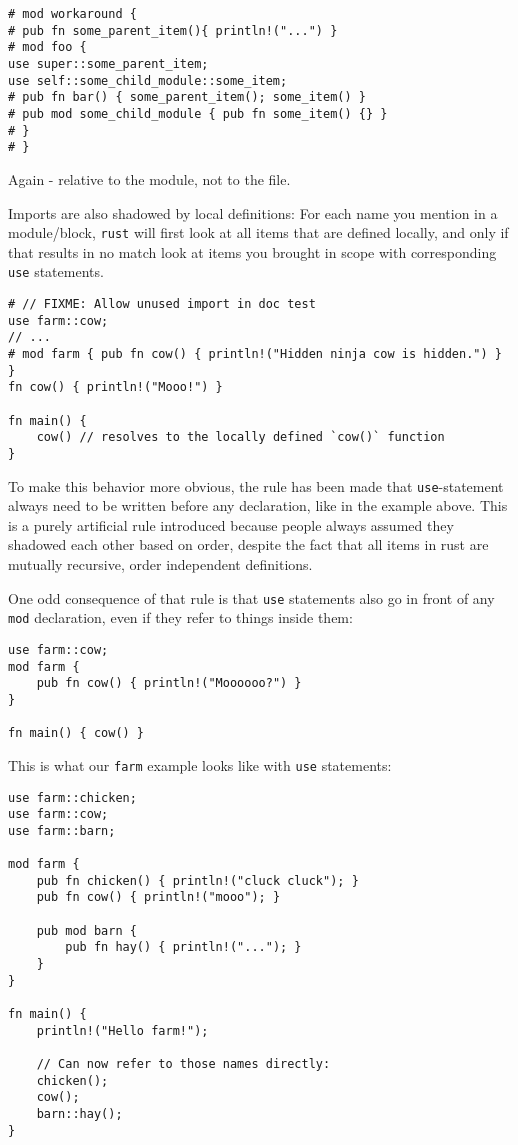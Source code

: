 \documentclass[]{article}
\begin{document}
\begin{verbatim}
# mod workaround {
# pub fn some_parent_item(){ println!("...") }
# mod foo {
use super::some_parent_item;
use self::some_child_module::some_item;
# pub fn bar() { some_parent_item(); some_item() }
# pub mod some_child_module { pub fn some_item() {} }
# }
# }
\end{verbatim}

Again - relative to the module, not to the file.

Imports are also shadowed by local definitions: For each name you
mention in a module/block, \texttt{rust} will first look at all items
that are defined locally, and only if that results in no match look at
items you brought in scope with corresponding \texttt{use} statements.

\begin{verbatim}
# // FIXME: Allow unused import in doc test
use farm::cow;
// ...
# mod farm { pub fn cow() { println!("Hidden ninja cow is hidden.") } }
fn cow() { println!("Mooo!") }

fn main() {
    cow() // resolves to the locally defined `cow()` function
}
\end{verbatim}

To make this behavior more obvious, the rule has been made that
\texttt{use}-statement always need to be written before any declaration,
like in the example above. This is a purely artificial rule introduced
because people always assumed they shadowed each other based on order,
despite the fact that all items in rust are mutually recursive, order
independent definitions.

One odd consequence of that rule is that \texttt{use} statements also go
in front of any \texttt{mod} declaration, even if they refer to things
inside them:

\begin{verbatim}
use farm::cow;
mod farm {
    pub fn cow() { println!("Moooooo?") }
}

fn main() { cow() }
\end{verbatim}

This is what our \texttt{farm} example looks like with \texttt{use}
statements:

\begin{verbatim}
use farm::chicken;
use farm::cow;
use farm::barn;

mod farm {
    pub fn chicken() { println!("cluck cluck"); }
    pub fn cow() { println!("mooo"); }

    pub mod barn {
        pub fn hay() { println!("..."); }
    }
}

fn main() {
    println!("Hello farm!");

    // Can now refer to those names directly:
    chicken();
    cow();
    barn::hay();
}
\end{verbatim}
\end{document}
